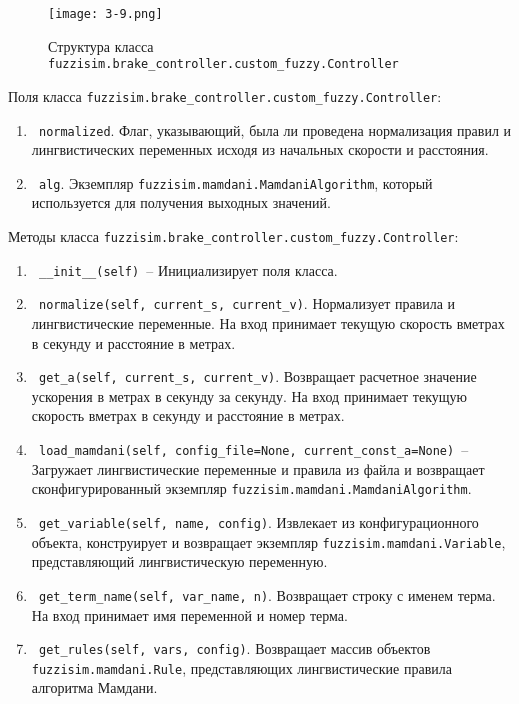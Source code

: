 \begin{figure}[ht]
	\centering
	\texttt{[image: 3-9.png]}
	\caption{ Структура класса \lstinline!fuzzisim.brake_controller.custom_fuzzy.Controller!}
\end{figure}

Поля класса \lstinline!fuzzisim.brake_controller.custom_fuzzy.Controller!:
\begin{enumerate}[label=\arabic*)]
	\item \lstinline! normalized!. Флаг, указывающий, была ли проведена нормализация правил и  лингвистических переменных исходя из начальных скорости и расстояния.
	\item \lstinline! alg!. Экземпляр \lstinline!fuzzisim.mamdani.MamdaniAlgorithm!, который используется для получения выходных значений.
\end{enumerate}


Методы класса \lstinline!fuzzisim.brake_controller.custom_fuzzy.Controller!:
\begin{enumerate}[label=\arabic*)]
	\item \lstinline! __init__(self) !– Инициализирует поля класса.
	\item \lstinline! normalize(self, current_s, current_v)!. Нормализует правила и лингвистические переменные. На вход принимает текущую скорость вметрах в секунду и расстояние в метрах.
	\item \lstinline! get_a(self, current_s, current_v)!. Возвращает расчетное значение ускорения в метрах в секунду за секунду. На вход принимает текущую скорость вметрах в секунду и расстояние в метрах.
	\item \lstinline! load_mamdani(self, config_file=None, current_const_a=None) !– Загружает лингвистические переменные и правила из файла и возвращает сконфигурированный экземпляр \lstinline!fuzzisim.mamdani.MamdaniAlgorithm!.
	\item \lstinline! get_variable(self, name, config)!. Извлекает из конфигурационного объекта, конструирует  и возвращает экземпляр \lstinline!fuzzisim.mamdani.Variable!, представляющий лингвистическую переменную.
	\item \lstinline! get_term_name(self, var_name, n)!.  Возвращает строку с именем терма. На вход принимает имя переменной и номер терма.
	\item \lstinline! get_rules(self, vars, config)!. Возвращает массив объектов \lstinline!fuzzisim.mamdani.Rule!, представляющих лингвистические правила алгоритма Мамдани.
\end{enumerate}

